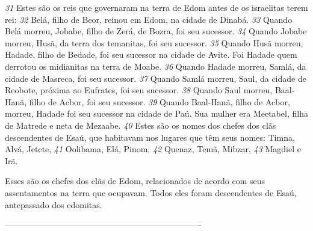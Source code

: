 \bigskip   
\textit{\tiny 31}
Estes    são os reis que governaram na terra de Edom antes de os israelitas terem
rei:
\textit{\tiny 32}
Belá, filho de Beor, reinou em Edom, na cidade de Dinabá.
\textit{\tiny 33}
Quando Belá morreu, Jobabe, filho de Zerá, de Bozra, foi seu sucessor.
\textit{\tiny 34}
Quando Jobabe morreu, Husã, da terra dos temanitas, foi seu sucessor.
\textit{\tiny 35}
Quando    Husã morreu, Hadade, filho de Bedade, foi seu sucessor na cidade de
 Avite. Foi Hadade quem derrotou os midianitas na terra de Moabe.
\textit{\tiny 36}
Quando Hadade morreu, Samlá, da cidade de Masreca, foi seu sucessor.
\textit{\tiny 37}
Quando Samlá morreu, Saul, da cidade de Reobote, próxima ao Eufrates,
 foi
 seu sucessor.
\textit{\tiny 38}
Quando Saul morreu, Baal-Hanã, filho de Acbor, foi seu sucessor.
\textit{\tiny 39}
Quando Baal-Hanã, filho de Acbor, morreu, Hadade
 foi seu sucessor na
 cidade de Paú. Sua mulher era Meetabel, filha de Matrede e neta de Mezaabe.
\textit{\tiny 40}
Estes  são os nomes dos chefes dos clãs descendentes de Esaú, que habitavam
nos lugares que têm seus nomes: Timna, Alvá, Jetete, 
\textit{\tiny 41}
Oolibama, Elá, Pinom,
\textit{\tiny 42}
Quenaz, Temã, Mibzar, 
\textit{\tiny 43}
Magdiel e Irã. 

\medskip   
Esses são os chefes dos clãs de Edom,
relacionados de acordo com seus assentamentos na terra que ocupavam. Todos
eles foram descendentes de Esaú, antepassado dos edomitas.

----------------------------------------------------------------------
